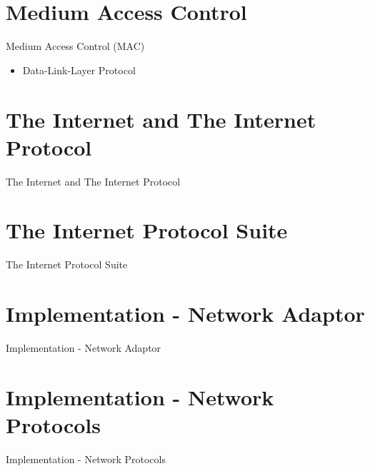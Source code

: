 \documentclass{beamer}
\begin{document}
\section{Medium Access Control}

    \begin{frame}{Medium Access Control (MAC)}
        \begin{itemize}
            \item Data-Link-Layer Protocol
        \end{itemize}
    \end{frame}

\section{The Internet and The Internet Protocol}

    \begin{frame}{The Internet and The Internet Protocol}

    \end{frame}

\section{The Internet Protocol Suite}

    \begin{frame}{The Internet Protocol Suite}

    \end{frame}

\section{Implementation - Network Adaptor}

    \begin{frame}{Implementation - Network Adaptor}

    \end{frame}

\section{Implementation - Network Protocols}

    \begin{frame}{Implementation - Network Protocols}

    \end{frame}
\end{document}
